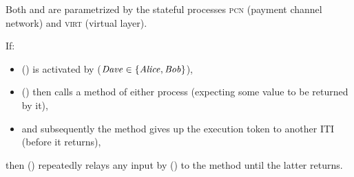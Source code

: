 Both \pchan and \fchan are parametrized by the stateful processes \textsc{pcn}
(payment channel network) and \textsc{virt} (virtual layer).

If:
\begin{itemize}
  \item \pchan (\fchan) is activated by \environment ($\mathit{Dave} \in \{\mathit{Alice},
  \mathit{Bob}\}$),
  \item \pchan (\fchan) then calls a method of either process (expecting some
  value to be returned by it),
  \item and subsequently the method gives up the execution token to another ITI
  (before it returns),
\end{itemize}
then \pchan (\fchan) repeatedly relays any input by \environment (\dave) to the
method until the latter returns.
